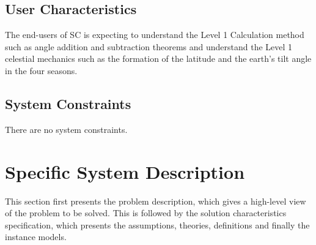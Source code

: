 \documentclass[12pt]{article}
\begin{document}
\subsection{User Characteristics} \label{SecUserCharacteristics}

The end-users of SC is expecting to understand the Level 1 Calculation method
such as angle addition and subtraction theorems and understand the Level 1 celestial
mechanics such as the formation of the latitude and the earth's tilt angle in the four seasons.

\subsection{System Constraints}

There are no system constraints.

\section{Specific System Description}

This section first presents the problem description, which gives a high-level
view of the problem to be solved.  This is followed by the solution characteristics
specification, which presents the assumptions, theories, definitions and finally
the instance models.  
\end{document}
